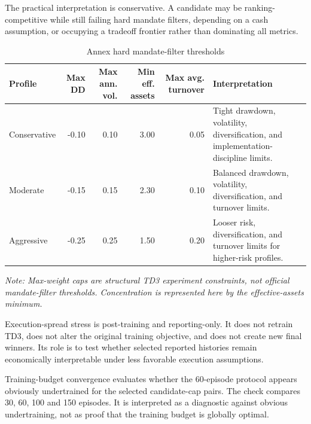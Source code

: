\documentclass[12pt]{article}
\begin{document}
The practical interpretation is conservative. A candidate may be ranking-competitive while still failing hard mandate filters, depending on a cash assumption, or occupying a tradeoff frontier rather than dominating all metrics.

\begin{table}[H]
\centering
\caption{Annex hard mandate-filter thresholds}
\scriptsize
\begin{tabularx}{\textwidth}{L{0.20\textwidth}rrrrY}
\toprule
\textbf{Profile} & \textbf{Max DD} & \textbf{Max ann. vol.} & \textbf{Min eff. assets} & \textbf{Max avg. turnover} & \textbf{Interpretation} \\
\midrule
Conservative & -0.10 & 0.10 & 3.00 & 0.05 & Tight drawdown, volatility, diversification, and implementation-discipline limits. \\
Moderate & -0.15 & 0.15 & 2.30 & 0.10 & Balanced drawdown, volatility, diversification, and turnover limits. \\
Aggressive & -0.25 & 0.25 & 1.50 & 0.20 & Looser risk, diversification, and turnover limits for higher-risk profiles. \\
\bottomrule
\end{tabularx}
\vspace{2pt}
\parbox{\textwidth}{\scriptsize\textit{Note: Max-weight caps are structural TD3 experiment constraints, not official mandate-filter thresholds. Concentration is represented here by the effective-assets minimum.}}
\end{table}


Execution-spread stress is post-training and reporting-only. It does not retrain TD3, does not alter the original training objective, and does not create new final winners. Its role is to test whether selected reported histories remain economically interpretable under less favorable execution assumptions.

Training-budget convergence evaluates whether the 60-episode protocol appears obviously undertrained for the selected candidate-cap pairs. The check compares 30, 60, 100 and 150 episodes. It is interpreted as a diagnostic against obvious undertraining, not as proof that the training budget is globally optimal.
\end{document}
